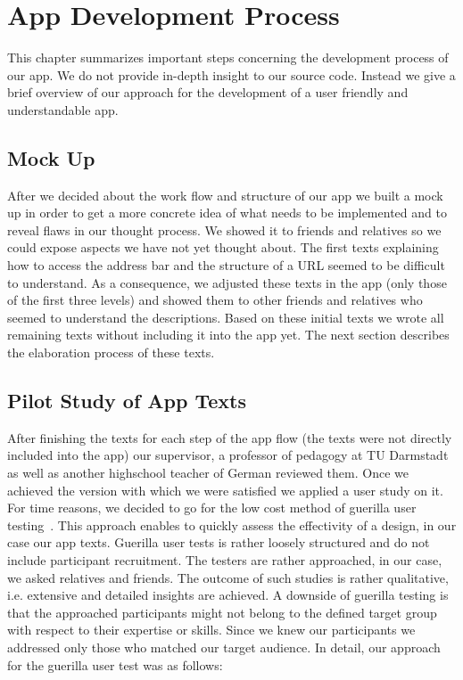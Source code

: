 
\section{App Development Process}
This chapter summarizes important steps concerning the development process of our app.
We do not provide in-depth insight to our source code. 
Instead we give a brief overview of our approach for the development of a user friendly and understandable app.
\subsection{Mock Up}
After we decided about the work flow and structure of our app we built a mock up in order to get a more concrete idea of what needs to be implemented and to reveal flaws in our thought process.
We showed it to friends and relatives so we could expose aspects we have not yet thought about.
The first texts explaining how to access the address bar and the structure of a URL seemed to be difficult to understand.
As a consequence, we adjusted these texts in the app (only those of the first three levels) and showed them to other friends and relatives who seemed to understand the descriptions.
Based on these initial texts we wrote all remaining texts without including it into the app yet.
The next section describes the elaboration process of these texts.
\subsection{Pilot Study of App Texts}
\label{s:pilot_study}
After finishing the texts for each step of the app flow (the texts were not directly included into the app) our supervisor, a professor of pedagogy at TU Darmstadt as well as another highschool teacher of German reviewed them.
Once we achieved the version with which we were satisfied we applied a user study on it. 
For time reasons, we decided to go for the low cost method of guerilla user testing~\cite{guerillagovuk, guerillauxbooth}.
This approach enables to quickly assess the effectivity of a design, in our case our app texts.
Guerilla user tests is rather loosely structured and do not include participant recruitment.
The testers are rather approached, in our case, we asked relatives and friends. 
The outcome of such studies is rather qualitative, i.e. extensive and detailed insights are achieved.
A downside of guerilla testing is that the approached participants might not belong to the defined target group with respect to their expertise or skills. 
Since we knew our participants we addressed only those who matched our target audience. 
In detail, our approach for the guerilla user test was as follows:

